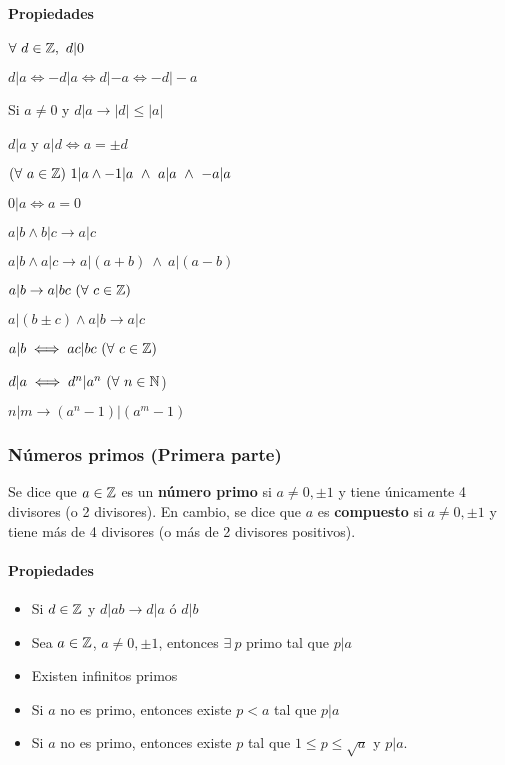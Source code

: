 \paragraph{Propiedades}
\begin{itemize}
\begin{multicols}{2}
    \item $\forall~d\in\mathbb{Z},~d|0$
    \item $d|a \iff -d|a \iff d|-a \iff -d|-a$
    \item Si $a\neq 0$ y $d|a\to |d|\leq|a|$
    \item $d|a$ y $a|d \iff a = \pm d$
    \item $(\forall~a\in\mathbb{Z})~1|a \land -1|a ~\land~ a|a~\land~-a|a$
    \item $0|a \iff a = 0$
    \item $a|b \land b|c \to a|c$
    \item $a|b \land a|c \to a|(a+b) ~ \land ~ a|(a-b)$
    \item $a|b \to a|bc~(\forall~c\in\mathbb{Z})$
    \item $a|(b\pm c) \land a|b \to a|c$
    \item $a|b \iff ac|bc~(\forall~c\in\mathbb{Z})$
    \item $d|a \iff d^n|a^n~(\forall~n\in\mathbb{N}$)
    \item $n|m \to (a^n-1)|(a^m-1)$
\end{multicols}
\end{itemize}

\subsubsection{Números primos (Primera parte)}
Se dice que $a\in\mathbb{Z}$ es un \textbf{número primo} si $a\neq0, \pm 1$ y tiene únicamente 4 divisores (o 2 divisores). En cambio, se dice que $a$ es \textbf{compuesto} si $a\neq0, \pm 1$ y tiene más de 4 divisores (o más de 2 divisores positivos).
\paragraph{Propiedades}
\begin{itemize}
\item Si $d\in\mathbb{Z}$ y $d|ab\to d|a$ ó $d|b$
\item Sea $a\in\mathbb{Z}$,  $a\neq0,\pm 1$, entonces $\exists~p$ primo tal que $p|a$
\item Existen infinitos primos
\item Si $a$ no es primo, entonces existe $p<a$ tal que $p|a$
\item Si $a$ no es primo, entonces existe $p$ tal que $1\leq p\leq\sqrt{a}$ y $p|a$.
\end{itemize}

